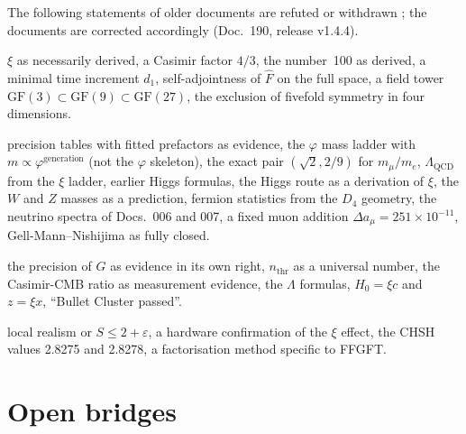 The following statements of older documents are refuted or withdrawn \XM; the documents are
corrected accordingly (Doc.~190, release v1.4.4).
\begin{description}[leftmargin=0pt,itemsep=3pt,font=\normalfont\bfseries]
\item[Foundations:] $\xi$ as necessarily derived, a
Casimir factor $4/3$, the number~100 as derived, a minimal time increment $d_1$, self-adjointness
of $\hat F$ on the full space, a field tower $\mathrm{GF}(3)\subset\mathrm{GF}(9)\subset\mathrm{GF}(27)$, the exclusion of fivefold symmetry in four dimensions.
\item[Particles:] precision tables with fitted
prefactors as evidence, the $\varphi$ mass ladder with $m\propto\varphi^{\text{generation}}$ (not the $\varphi$ skeleton), the exact pair $(\sqrt2,2/9)$ for $m_\mu/m_e$,
$\Lambda_{\text{QCD}}$ from the $\xi$ ladder, earlier Higgs formulas, the Higgs route as a derivation of $\xi$, the $W$ and $Z$ masses as a prediction, fermion statistics from the $D_4$ geometry, the neutrino spectra of
Docs.~006 and 007, a fixed muon addition $\Delta a_\mu=251\times10^{-11}$, Gell-Mann--Nishijima as
fully closed.
\item[Gravitation and cosmos:] the precision of $G$ as evidence in its own right,
$n_{\text{thr}}$ as a universal number, the Casimir-CMB ratio as measurement evidence, the
$\Lambda$ formulas, $H_0=\xi c$ and $z=\xi x$, ``Bullet Cluster passed''.
\item[Quantum mechanics:] local realism or $S\le2+\varepsilon$, a hardware confirmation of the $\xi$ effect, the CHSH values
2.8275 and 2.8278, a factorisation method specific to FFGFT.
\end{description}

\section{Open bridges}

